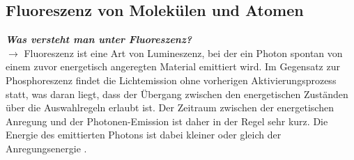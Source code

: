 \subsection{\label{subsec:FZV1}Fluoreszenz von Molekülen und Atomen}
\textbf{\textit{Was versteht man unter Fluoreszenz?}} \\
$\rightarrow$
Fluoreszenz ist eine Art von Lumineszenz, bei der ein Photon spontan von einem zuvor 
energetisch angeregten Material emittiert wird. 
Im Gegensatz zur Phosphoreszenz findet die Lichtemission ohne vorherigen    
Aktivierungsprozess statt, was daran liegt, dass der Übergang zwischen den 
energetischen Zuständen über die Auswahlregeln erlaubt ist.
Der Zeitraum zwischen der energetischen Anregung und der Photonen-Emission 
ist daher in der Regel sehr kurz. 
Die Energie des emittierten Photons ist dabei kleiner oder gleich der 
Anregungsenergie \cite{EPC, AMO, Demtroder, Prinzip}. \\

